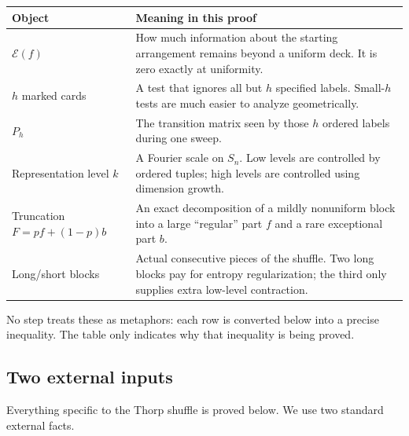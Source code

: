 \documentclass[11pt]{article}
\numberwithin{equation}{section}
\theoremstyle{definition}\newtheorem{definition}[theorem]{Definition}
\theoremstyle{remark}\newtheorem{remark}[theorem]{Remark}
\newcommand{\Ent}{\mathcal E}
\begin{document}
\begin{center}
\begin{tabular}{p{}p{}}
\toprule
Object & Meaning in this proof \\
\midrule
$\Ent(f)$ & How much information about the starting arrangement remains beyond a uniform deck.  It is zero exactly at uniformity. \\
$h$ marked cards & A test that ignores all but $h$ specified labels.  Small-$h$ tests are much easier to analyze geometrically. \\
$P_h$ & The transition matrix seen by those $h$ ordered labels during one sweep. \\
Representation level $k$ & A Fourier scale on $S_n$.  Low levels are controlled by ordered tuples; high levels are controlled using dimension growth. \\
Truncation $F=pf+(1-p)b$ & An exact decomposition of a mildly nonuniform block into a large ``regular'' part $f$ and a rare exceptional part $b$. \\
Long/short blocks & Actual consecutive pieces of the shuffle.  Two long blocks pay for entropy regularization; the third only supplies extra low-level contraction. \\
\bottomrule
\end{tabular}
\end{center}

No step treats these as metaphors: each row is converted below into a precise
inequality.  The table only indicates why that inequality is being proved.

\subsection{Two external inputs}\label{subsec:external}
Everything specific to the Thorp shuffle is proved below.  We use two standard
external facts.
\end{document}
